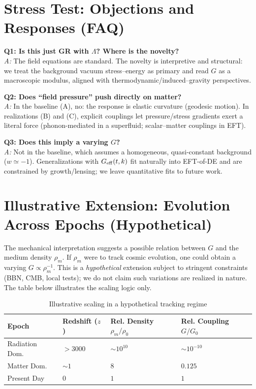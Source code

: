\documentclass[11pt,a4paper]{article}
\begin{document}
\section{Stress Test: Objections and Responses (FAQ)}
\label{app:faq}
\textbf{Q1: Is this just GR with $\Lambda$? Where is the novelty?}\\
\emph{A:} The field equations are standard. The novelty is interpretive and structural:
we treat the background vacuum stress--energy as primary and read $G$ as a macroscopic modulus,
aligned with thermodynamic/induced--gravity perspectives.\cite{Jacobson1995,Sakharov1967,Padmanabhan2004}

\textbf{Q2: Does ``field pressure'' push directly on matter?}\\
\emph{A:} In the baseline (A), no: the response is elastic curvature (geodesic motion).
In realizations (B) and (C), explicit couplings let pressure/stress gradients exert a literal force
(phonon-mediated in a superfluid; scalar--matter couplings in EFT).\cite{BerezhianiKhoury2015,Gubitosi2013}

\textbf{Q3: Does this imply a varying $G$?}\\
\emph{A:} Not in the baseline, which assumes a homogeneous, quasi-constant background ($w\simeq -1$).
Generalizations with $G_{\rm eff}(t,k)$ fit naturally into EFT-of-DE and are constrained by growth/lensing;
we leave quantitative fits to future work.\cite{Gubitosi2013}

\section{Illustrative Extension: Evolution Across Epochs (Hypothetical)}
\label{app:evolution}
The mechanical interpretation suggests a possible relation between $G$ and the medium density $\rho_m$. If $\rho_m$ were to track cosmic evolution, one could obtain a varying $G\propto \rho_m^{-1}$. This is a \emph{hypothetical} extension subject to stringent constraints (BBN, CMB, local tests); we do not claim such variations are realized in nature. The table below illustrates the scaling logic only.

\begin{table}[h]
\centering
\caption{Illustrative scaling in a hypothetical tracking regime}
\label{tab:epochs}
\vspace{2mm}
\begin{tabular}{@{}llll@{}}
\toprule
\textbf{Epoch} & \textbf{Redshift ($z$)} & \textbf{Rel. Density $\rho_m / \rho_0$} & \textbf{Rel. Coupling $G/G_0$} \\ \midrule
Radiation Dom. & $> 3000$ & $\sim 10^{10}$ & $\sim 10^{-10}$ \\
Matter Dom. & $\sim 1$ & $8$ & $0.125$ \\
Present Day & $0$ & $1$ & $1$ \\ \bottomrule
\end{tabular}
\end{table}
\end{document}
